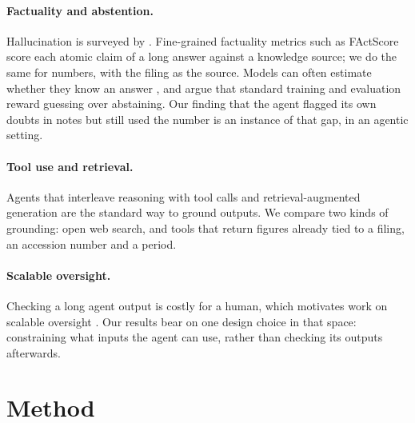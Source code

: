 \documentclass[10pt,a4paper]{article}
\begin{document}
\paragraph{Factuality and abstention.} Hallucination is surveyed by \citet{ji2023}. Fine-grained factuality metrics
such as FActScore \citep{min2023factscore} score each atomic claim of a long answer against a knowledge source; we do
the same for numbers, with the filing as the source. Models can often estimate whether they know an answer
\citep{kadavath2022}, and \citet{kalai2025} argue that standard training and evaluation reward guessing over
abstaining. Our finding that the agent flagged its own doubts in notes but still used the number is an instance of
that gap, in an agentic setting.

\paragraph{Tool use and retrieval.} Agents that interleave reasoning with tool calls \citep{yao2023react,schick2023}
and retrieval-augmented generation \citep{lewis2020} are the standard way to ground outputs. We compare two kinds of
grounding: open web search, and tools that return figures already tied to a filing, an accession number and a
period.

\paragraph{Scalable oversight.} Checking a long agent output is costly for a human, which motivates work on scalable
oversight \citep{bowman2022}. Our results bear on one design choice in that space: constraining what inputs the agent
can use, rather than checking its outputs afterwards.

\section{Method}
\end{document}
